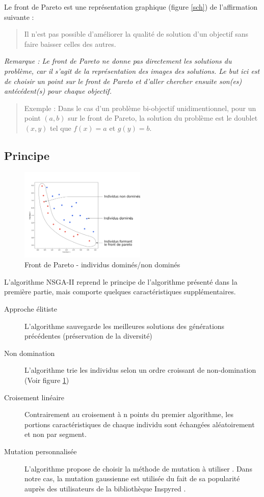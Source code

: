 \documentclass[12pt]{report}
\begin{document}
    Le front de Pareto est une représentation graphique (figure \ref{sch}) de l'affirmation suivante :
    \begin{quotation}
      Il n'est pas possible d'améliorer la qualité de solution d'un objectif sans faire baisser celles des autres.
    \end{quotation}

    \emph{Remarque : Le front de Pareto ne donne pas directement les solutions du problème, car il s'agit de la représentation des images des solutions. Le but ici est de choisir un point sur le front de Pareto et d'aller chercher ensuite son(es) antécédent(s) pour chaque objectif.}

    \begin{quotation}
      Exemple : Dans le cas d'un problème bi-objectif unidimentionnel, pour un point $(a,b)$ sur le front de Pareto, la solution du problème est le doublet $(x,y)$ tel que $f(x)=a$ et $g(y)=b$.
    \end{quotation}



      \subsection{Principe}
      \begin{figure}
        \centering
        \includegraphics[width=6cm]{img/Pareto_domine.png}
        \caption{Front de Pareto - individus dominés/non dominés}
        \label{non_domine}
      \end{figure}
      L'algorithme NSGA-II reprend le principe de l'algorithme présenté dans la première partie, mais comporte quelques caractéristiques supplémentaires.


      \begin{description}
        \item [Approche élitiste] L'algorithme sauvegarde les meilleures solutions des générations précédentes (préservation de la diversité)
        \item [Non domination] L'algorithme trie les individus selon un ordre croissant de non-domination (Voir figure \ref{non_domine})
        \item [Croisement linéaire] Contrairement au croisement à n points du premier algorithme, les portions caractéristiques de chaque individu sont échangées aléatoirement et non par segment.
        \item [Mutation personnalisée] L'algorithme propose de choisir la méthode de mutation à utiliser \cite{wiki6}. Dans notre cas, la mutation gaussienne est utilisée du fait de sa popularité auprès des utilisateurs de la bibliothèque Inspyred \cite{inspyred}.
      \end{description}
\end{document}
